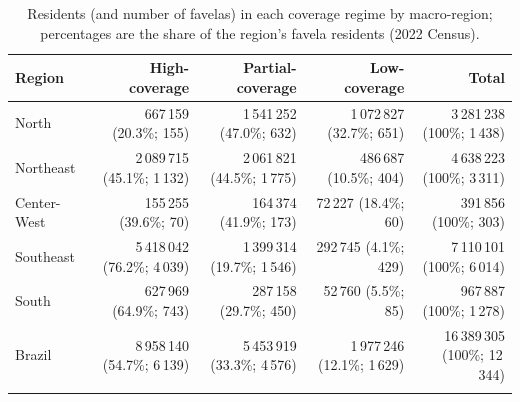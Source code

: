 \begin{table}[h]
\caption{Residents (and number of favelas) in each coverage regime by macro-region; percentages are the share of the region's favela residents (2022 Census).}\label{tab:region_regime}
\begin{tabular}{@{}lrrrr@{}}
\toprule
Region & High-coverage & Partial-coverage & Low-coverage & Total \\
\midrule
North & 667\,159 (20.3\%; 155) & 1\,541\,252 (47.0\%; 632) & 1\,072\,827 (32.7\%; 651) & 3\,281\,238 (100\%; 1\,438) \\
Northeast & 2\,089\,715 (45.1\%; 1\,132) & 2\,061\,821 (44.5\%; 1\,775) & 486\,687 (10.5\%; 404) & 4\,638\,223 (100\%; 3\,311) \\
Center-West & 155\,255 (39.6\%; 70) & 164\,374 (41.9\%; 173) & 72\,227 (18.4\%; 60) & 391\,856 (100\%; 303) \\
Southeast & 5\,418\,042 (76.2\%; 4\,039) & 1\,399\,314 (19.7\%; 1\,546) & 292\,745 (4.1\%; 429) & 7\,110\,101 (100\%; 6\,014) \\
South & 627\,969 (64.9\%; 743) & 287\,158 (29.7\%; 450) & 52\,760 (5.5\%; 85) & 967\,887 (100\%; 1\,278) \\
\midrule
Brazil & 8\,958\,140 (54.7\%; 6\,139) & 5\,453\,919 (33.3\%; 4\,576) & 1\,977\,246 (12.1\%; 1\,629) & 16\,389\,305 (100\%; 12\,344) \\
\botrule
\end{tabular}
\end{table}
